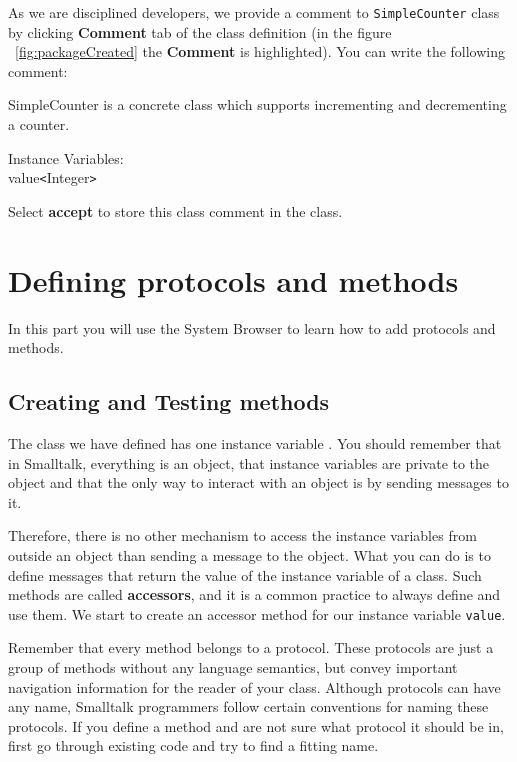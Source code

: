 As we are disciplined developers, we provide a comment to
\texttt{SimpleCounter} class by clicking \textbf{Comment} tab of
the class definition (in the figure ~\ref{fig:packageCreated} the
\textbf{Comment} is highlighted). You can write the following
comment:

\begin{code}
SimpleCounter is a concrete class which supports incrementing
and decrementing a counter.

Instance Variables:\\
value\tab \texttt{<}Integer\texttt{>}
\end{code}

Select \textbf{accept} to store this class comment in the class.


\section*{Defining protocols and methods}
In this part you will use the System Browser to learn how to add
protocols and methods.


\subsection*{Creating and Testing methods}
The class we have defined has one instance variable . You should
remember that in Smalltalk, everything is an object, that instance variables are private to the object and  that the only way to interact with an object is by sending messages to it.

Therefore, there is no other mechanism to access the instance variables
from outside an object than sending a message to the object. What you can do is to define messages that return the value of the instance variable of a class. Such methods are called \textbf{accessors}, and it is a common practice to always define and use them. We start to create an accessor method for our
instance variable \texttt{value}.

Remember that every method belongs to a protocol. These protocols are just
a group of methods without any language semantics, but convey important
navigation information for the reader of your class. Although protocols
can have any name, Smalltalk programmers follow certain conventions for
naming these protocols. If you define a method and are not sure what
protocol it should be in, first go through existing code and try to
find a fitting name.


